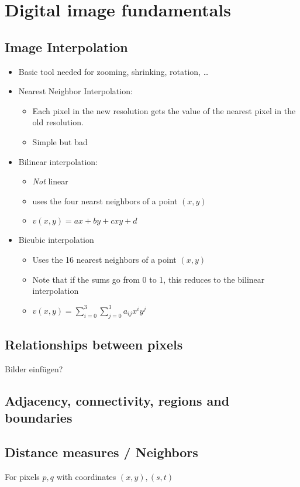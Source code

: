 \section{Digital image fundamentals }
\subsection{Image Interpolation}
\begin{itemize}
  \item Basic tool needed for zooming, shrinking, rotation, \ldots
  \item Nearest Neighbor Interpolation: 
	  \begin{itemize}
		  \item Each pixel in the new resolution gets the value of the nearest pixel in the old resolution.
		  \item Simple but bad
	\end{itemize}
  \item Bilinear interpolation:
  	\begin{itemize}
		\item \emph{Not} linear
  	  \item uses the four nearst neighbors of a point $(x,y)$
  	  \item $v(x,y) = ax + by + cxy + d$
  	\end{itemize}
  \item Bicubic interpolation
	\begin{itemize}
  	  \item Uses the 16 nearest neighbors of a point $(x,y)$
  	  \item Note that if the sums go from 0 to 1, this reduces to the bilinear interpolation
  	  \item $v(x,y) = \sum\limits_{i=0}^3\sum\limits_{j=0}^3 a_{ij}x^iy^j$
  	\end{itemize}
\end{itemize}

\subsection{Relationships between pixels}
Bilder einfügen?

\subsection{Adjacency, connectivity, regions and boundaries}

\subsection{Distance measures / Neighbors}
For pixels $p,q$  with coordinates $(x,y), (s,t)$
